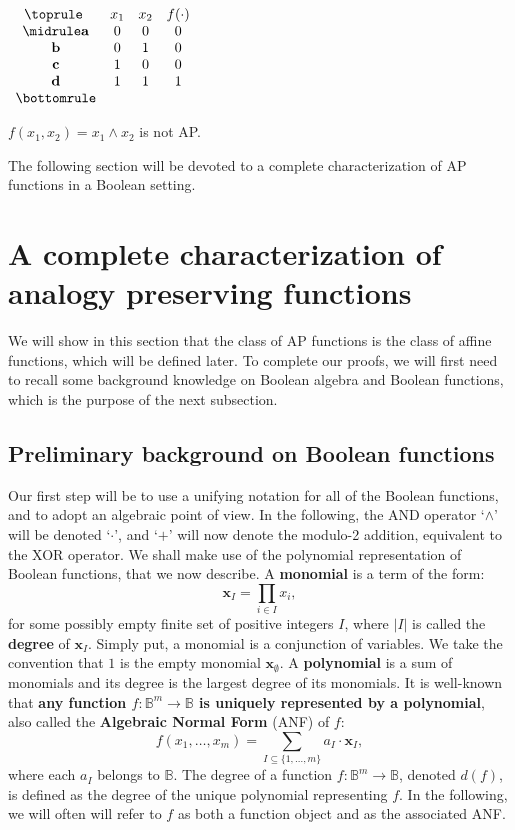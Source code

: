 \begin{table}[ht]
  \center
$\begin{array}{cccc}
  \toprule
  ~ & x_1 & x_2 & f(\cdot) \\
  \midrule
  \mathbf{a} & 0 & 0 & 0\\
  \mathbf{b} & 0 & 1 & 0\\
  \mathbf{c} & 1 & 0 & 0\\
  \mathbf{d} & 1 & 1 & 1\\
  \bottomrule
\end{array}
$\bigskip
\caption{$f(x_1,x_2)= x_1 \wedge x_2$ is not AP.}
\label{exampleNotAP}
\end{table}

The following section will be devoted to a complete characterization of AP
functions in a Boolean setting.

\section{A complete characterization of analogy preserving functions}
\label{SEC:a_complete_characterization_of_AP_functions}

We will show in this section that the class of AP functions is the class of
affine functions, which will be defined later. To complete our proofs, we will
first need to recall some background knowledge on Boolean algebra and Boolean
functions, which is the purpose of the next subsection.

\subsection{Preliminary background on Boolean functions}

Our first step will be to use a unifying notation for all of the Boolean
functions, and to adopt an algebraic point of view.  In the following, the AND
operator `$\wedge$' will be denoted `$\cdot$', and `$+$' will now denote the
modulo-2 addition, equivalent to the XOR operator.  We shall make use of the
polynomial representation of Boolean functions, that we now describe. A
\textbf{ monomial} is a term of the form:
$$\mathbf{x}_I=\underset{i\in I}{\prod}x_i,$$ for some possibly empty finite
set of positive integers $I$, where $|I|$ is called the \textbf{degree} of
$\mathbf{x}_I$. Simply put, a monomial is a conjunction of variables. We take
the convention that $1$ is the empty monomial $\mathbf{x}_\emptyset $. A
\textbf{ polynomial} is a sum of monomials and its degree is the largest degree
of its monomials.  It is well-known \cite{StoneAlgebra36,ZhegalkinAlgebra27}
that \textbf{any function $f:\mathbb{B}^m\rightarrow \mathbb{B}$ is uniquely
represented by a polynomial}, also called the \textbf{Algebraic Normal Form}
(ANF) of $f$:
$$f(x_1,\ldots,x_m)=\sum_{I\subseteq \{1,\ldots,m\}}a_I\cdot \mathbf{x}_I,$$
where each $a_I$ belongs to $\mathbb{B}$. The degree of a function $f:\mathbb{B}^m\rightarrow
\mathbb{B}$, denoted $d(f)$, is defined as the degree of the unique polynomial
representing $f$. In the following, we will often will refer to $f$ as both a
function object and as the associated ANF.

